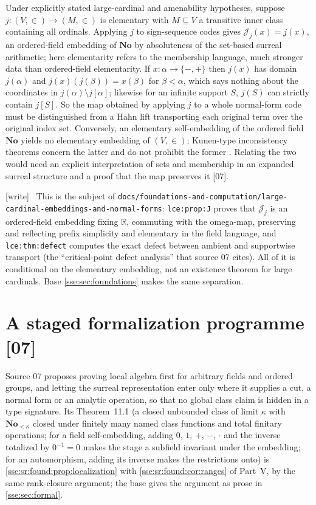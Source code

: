 \documentclass[11pt,a4paper]{article}
\numberwithin{equation}{section}
\theoremstyle{plain}
\theoremstyle{definition}
\theoremstyle{remark}
\newcommand{\No}{\mathbf{No}}
\newcommand{\R}{\mathbb{R}}
\newcommand{\lbl}[1]{\nolinkurl{#1}}%
\newcommand{\fn}[1]{\nolinkurl{#1}}%
\newcommand{\src}[1]{\textup{\textsf{\small[#1]}}}%
\newcommand{\wtag}{\textup{\textsf{[write]}}}%
\newenvironment{wnote}{\par\smallskip\noindent\wtag\ }{\par\smallskip}
\begin{document}
Under explicitly stated large-cardinal and amenability hypotheses, suppose
$j:(V,\in)\to(M,\in)$ is elementary with $M\subseteq V$ a transitive inner
class containing all ordinals. Applying $j$ to sign-sequence codes gives
$\mathcal J_j(x)=j(x)$, an ordered-field embedding of $\No$ by absoluteness of
the set-based surreal arithmetic; here elementarity refers to the membership
language, much stronger data than ordered-field elementarity. If
$x:\alpha\to\{-,+\}$ then $j(x)$ has domain $j(\alpha)$ and
$j(x)(j(\beta))=x(\beta)$ for $\beta<\alpha$, which says nothing about the
coordinates in $j(\alpha)\setminus j[\alpha]$; likewise for an infinite
support $S$, $j(S)$ can strictly contain $j[S]$. So the map obtained by
applying $j$ to a whole normal-form code must be distinguished from a Hahn lift
transporting each original term over the original index set. Conversely, an
elementary self-embedding of the ordered field $\No$ yields no elementary
embedding of $(V,\in)$; Kunen-type inconsistency theorems concern the latter
and do not prohibit the former \cite{pf-HKP}. Relating the two would need an
explicit interpretation of sets and membership in an expanded surreal
structure and a proof that the map preserves it \src{07}.
\begin{wnote}
This is the subject of
\fn{docs/foundations-and-computation/large-cardinal-embeddings-and-normal-forms}:
\lbl{lce:prop:J} proves that $\mathcal J_j$ is an ordered-field embedding fixing
$\R$, commuting with the omega-map, preserving and reflecting prefix
simplicity and elementary in the field language, and \lbl{lce:thm:defect}
computes the exact defect between ambient and supportwise transport (the
``critical-point defect analysis'' that source 07 cites). All of it is
conditional on the elementary embedding, not an existence theorem for large
cardinals. Base \cref{sse:sec:foundations} makes the same separation.
\end{wnote}

\section{A staged formalization programme \src{07}}\label{sse:an:sec:formalization}

Source 07 proposes proving local algebra first for arbitrary fields and
ordered groups, and letting the surreal representation enter only where it
supplies a cut, a normal form or an analytic operation, so that no global
class claim is hidden in a type signature. Its Theorem~11.1 (a closed
unbounded class of limit $\kappa$ with $\No_{<\kappa}$ closed under finitely
many named class functions and total finitary operations; for a field
self-embedding, adding $0$, $1$, $+$, $-$, $\cdot$ and the inverse totalized by
$0^{-1}=0$ makes the stage a subfield invariant under the embedding; for an
automorphism, adding its inverse makes the restrictions onto) is
\cref{sse:sr:found:prop:localization} with \cref{sse:sr:found:cor:ranges}
of Part~V, by the same rank-closure argument; the base gives the argument as
prose in \cref{sse:sec:formal}.
\end{document}
